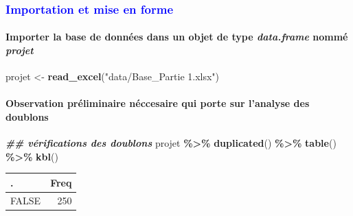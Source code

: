 \documentclass[
]{article}
\newenvironment{Shaded}{\begin{snugshade}}{\end{snugshade}}
\newcommand{\DocumentationTok}[1]{\textcolor[rgb]{0.56,0.35,0.01}{\textbf{\textit{#1}}}}
\newcommand{\FunctionTok}[1]{\textcolor[rgb]{0.13,0.29,0.53}{\textbf{#1}}}
\newcommand{\NormalTok}[1]{#1}
\newcommand{\OtherTok}[1]{\textcolor[rgb]{0.56,0.35,0.01}{#1}}
\newcommand{\SpecialCharTok}[1]{\textcolor[rgb]{0.81,0.36,0.00}{\textbf{#1}}}
\newcommand{\StringTok}[1]{\textcolor[rgb]{0.31,0.60,0.02}{#1}}
\begin{document}
\textcolor{blue}{\subsubsection{Importation et mise en forme}}

\hfill\break

\hypertarget{importer-la-base-de-donnuxe9es-dans-un-objet-de-type-data.frame-nommuxe9-projet}{%
\paragraph{\texorpdfstring{Importer la base de données dans un objet de
type \textbf{\emph{data.frame}} nommé
\textbf{\emph{projet}}}{Importer la base de données dans un objet de type data.frame nommé projet}}\label{importer-la-base-de-donnuxe9es-dans-un-objet-de-type-data.frame-nommuxe9-projet}}

\hfill\break

\begin{Shaded}
\begin{Highlighting}[]
\NormalTok{projet }\OtherTok{\textless{}{-}} \FunctionTok{read\_excel}\NormalTok{(}\StringTok{"data/Base\_Partie 1.xlsx"}\NormalTok{)}
\end{Highlighting}
\end{Shaded}

\hfill\break

\hypertarget{observation-pruxe9liminaire-nuxe9ccesaire-qui-porte-sur-lanalyse-des-doublons}{%
\paragraph{Observation préliminaire néccesaire qui porte sur l'analyse
des
doublons}\label{observation-pruxe9liminaire-nuxe9ccesaire-qui-porte-sur-lanalyse-des-doublons}}

\hfill\break

\begin{Shaded}
\begin{Highlighting}[]
\DocumentationTok{\#\# vérifications des doublons}
\NormalTok{projet }\SpecialCharTok{\%\textgreater{}\%} 
  \FunctionTok{duplicated}\NormalTok{() }\SpecialCharTok{\%\textgreater{}\%} 
    \FunctionTok{table}\NormalTok{() }\SpecialCharTok{\%\textgreater{}\%}
       \FunctionTok{kbl}\NormalTok{()}
\end{Highlighting}
\end{Shaded}

\begin{tabular}[t]{l|r}
\hline
. & Freq\\
\hline
FALSE & 250\\
\hline
\end{tabular}
\end{document}
